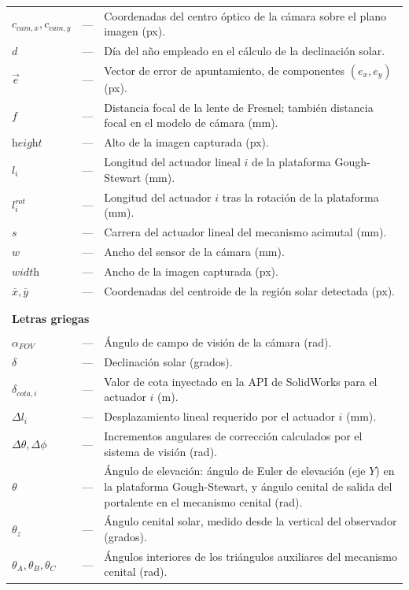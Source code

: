 \begin{longtable}{lcp{} }
$c_{cam,x},c_{cam,y}$ & --- & Coordenadas del centro óptico de la cámara sobre el plano imagen (px).\\
$d$        & --- & Día del año empleado en el cálculo de la declinación solar.\\
$\vec{e}$  & --- & Vector de error de apuntamiento, de componentes $(e_x,e_y)$ (px).\\
$f$        & --- & Distancia focal de la lente de Fresnel; también distancia focal en el modelo de cámara (mm).\\
$\textit{height}$ & --- & Alto de la imagen capturada (px).\\
$l_i$      & --- & Longitud del actuador lineal $i$ de la plataforma Gough-Stewart (mm).\\
$l_i^{rot}$ & --- & Longitud del actuador $i$ tras la rotación de la plataforma (mm).\\
$s$        & --- & Carrera del actuador lineal del mecanismo acimutal (mm).\\
$w$        & --- & Ancho del sensor de la cámara (mm).\\
$\textit{width}$ & --- & Ancho de la imagen capturada (px).\\
$\bar{x},\bar{y}$ & --- & Coordenadas del centroide de la región solar detectada (px).\\
\\
\\
\multicolumn{3}{l}{\textbf{Letras griegas}}\\
\\
$\alpha_{FOV}$ & --- & Ángulo de campo de visión de la cámara (rad).\\
$\delta$   & --- & Declinación solar (grados).\\
$\delta_{cota,i}$ & --- & Valor de cota inyectado en la API de SolidWorks para el actuador $i$ (m).\\
$\Delta l_i$ & --- & Desplazamiento lineal requerido por el actuador $i$ (mm).\\
$\Delta\theta,\Delta\phi$ & --- & Incrementos angulares de corrección calculados por el sistema de visión (rad).\\
$\theta$   & --- & Ángulo de elevación: ángulo de Euler de elevación (eje $Y$) en la plataforma Gough-Stewart, y ángulo cenital de salida del portalente en el mecanismo cenital (rad).\\
$\theta_z$ & --- & Ángulo cenital solar, medido desde la vertical del observador (grados).\\
$\theta_A,\theta_B,\theta_C$ & --- & Ángulos interiores de los triángulos auxiliares del mecanismo cenital (rad).\\

\end{longtable}
